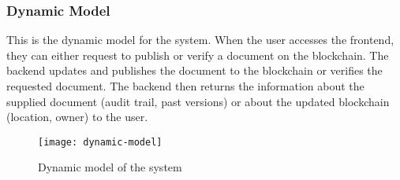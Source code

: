 \newpage
\subsubsection{Dynamic Model}
This is the dynamic model for the system. When the user accesses the frontend, they can either request to 
publish or verify a document on the blockchain. The backend updates and publishes the document to 
the blockchain or verifies the requested document. The backend then returns the information about the supplied 
document (audit trail, past versions) or about the updated 
blockchain (location, owner) to the user. 

\begin{figure}[h]
\centering %
\texttt{[image: dynamic-model]} 
\caption{Dynamic model of the system}
\label{fig: dynamic-model} %
\end{figure}
\newpage
